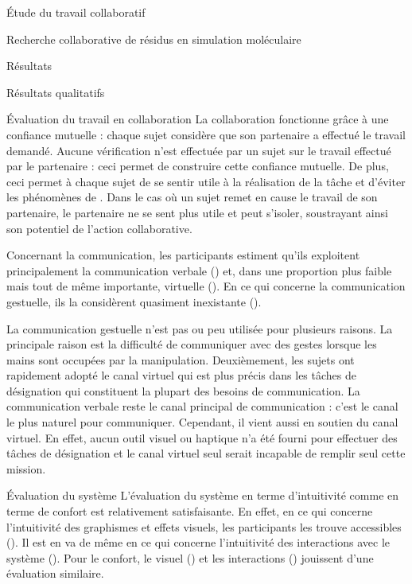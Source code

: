 \documentclass[myfrancais]{mythesis}
\begin{document}
\begin{mypart}{Étude du travail collaboratif}
\begin{mychapter}{Recherche collaborative de résidus en simulation moléculaire}
\begin{mysection}{Résultats}
\begin{mysubsection}{Résultats qualitatifs}
\begin{mysubsubsection}{Évaluation du travail en collaboration}
						La collaboration fonctionne grâce à une confiance mutuelle : chaque sujet considère que son partenaire a effectué le travail demandé.
						Aucune vérification n'est effectuée par un sujet sur le travail effectué par le partenaire : ceci permet de construire cette confiance mutuelle.
						De plus, ceci permet à chaque sujet de se sentir utile à la réalisation de la tâche et d'éviter les phénomènes de .
						Dans le cas où un sujet remet en cause le travail de son partenaire, le partenaire ne se sent plus utile et peut s'isoler, soustrayant ainsi son potentiel de l'action collaborative.

						Concernant la communication, les participants estiment qu'ils exploitent principalement la communication verbale () et, dans une proportion plus faible mais tout de même importante, virtuelle ().
						En ce qui concerne la communication gestuelle, ils la considèrent quasiment inexistante ().

						La communication gestuelle n'est pas ou peu utilisée pour plusieurs raisons.
						La principale raison est la difficulté de communiquer avec des gestes lorsque les mains sont occupées par la manipulation.
						Deuxièmement, les sujets ont rapidement adopté le canal virtuel qui est plus précis dans les tâches de désignation qui constituent la plupart des besoins de communication.
						La communication verbale reste le canal principal de communication : c'est le canal le plus naturel pour communiquer.
						Cependant, il vient aussi en soutien du canal virtuel.
						En effet, aucun outil visuel ou haptique n'a été fourni pour effectuer des tâches de désignation et le canal virtuel seul serait incapable de remplir seul cette mission.
					\end{mysubsubsection}
					\begin{mysubsubsection}{Évaluation du système}
						L'évaluation du système en terme d'intuitivité comme en terme de confort est relativement satisfaisante.
						En effet, en ce qui concerne l'intuitivité des graphismes et effets visuels, les participants les trouve accessibles ().
						Il est en va de même en ce qui concerne l'intuitivité des interactions avec le système ().
						Pour le confort, le visuel () et les interactions () jouissent d'une évaluation similaire.


\end{mysubsubsection}
\end{mysubsection}
\end{mysection}
\end{mychapter}
\end{mypart}
\end{document}
